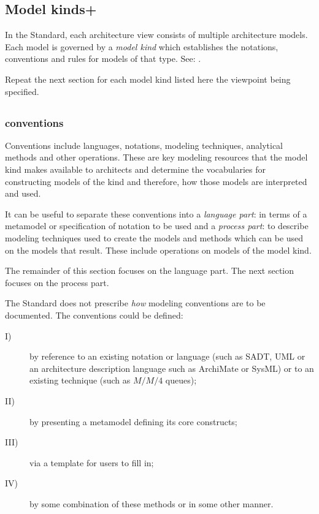 \subsection{Model kinds+}\label{mk:list}


In the Standard, each architecture view consists of multiple
architecture models. Each model is governed by a \textit{model kind}
which establishes the notations, conventions and rules for models of
that type.  See: .

Repeat the next section for each model kind listed here the viewpoint
being specified.


\subsection{}\label{vp:mk}



\subsubsection{ conventions} 


Conventions include languages, notations, modeling techniques,
analytical methods and other operations. These are key modeling
resources that the model kind makes available to architects and
determine the vocabularies for constructing models of the kind and
therefore, how those models are interpreted and used.

It can be useful to separate these conventions into a \emph{language
  part}: in terms of a metamodel or specification of notation to be
used and a \emph{process part}: to describe modeling techniques used
to create the models and methods which can be used on the models that
result.  These include operations on models of the model kind.

The remainder of this section focuses on the language part. The next
section focuses on the process part.

The Standard does not prescribe \emph{how} modeling conventions are to
be documented.  The conventions could be defined:
\begin{description}
\item[I)] by reference to an existing notation or language (such as
  SADT, UML or an architecture description language such as ArchiMate
  or SysML) or to an existing technique (such as $M/M/4$ queues);
\item[II)] by presenting a metamodel defining its core constructs;
\item[III)] via a template for users to fill in;
\item[IV)] by some combination of these methods or in some other
  manner.
\end{description}

